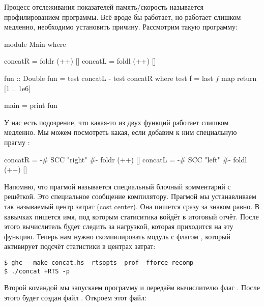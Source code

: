 Процесс отслеживания показателей память/скорость называется
профилированием программы. Всё вроде бы работает, но работает слишком
медленно, необходимо установить причину. Рассмотрим такую программу:


\begin{code}
module Main where

concatR = foldr (++) [] 
concatL = foldl (++) []

fun :: Double
fun = test concatL - test concatR
    where test f = last $ f $ map return [1 .. 1e6]

main = print fun
\end{code}

У нас есть подозрение, что какая-то из двух функций 
работает слишком медленно. Мы можем посмотреть какая, если добавим к ним
специальную прагму :


\begin{code}
concatR = {-# SCC "right" #-} foldr (++) [] 
concatL = {-# SCC "left"  #-} foldl (++) []
\end{code}

Напомню, что прагмой называется специальный блочный комментарий с
решёткой. Это специальное сообщение компилятору. Прагмой  мы
устанавливаем так называемый центр затрат (cost center). Она пишется
сразу за знаком равно. В кавычках пишется имя, под которым статиситика
войдёт в итоговый отчёт. После этого вычислитель будет следить за
нагрузкой, которая приходится на эту функцию. Теперь нам нужно
скомпилировать модуль с флагом , который активирует подсчёт
статистики в центрах затрат:


\begin{verbatim}
$ ghc --make concat.hs -rtsopts -prof -fforce-recomp
$ ./concat +RTS -p
\end{verbatim}

Второй командой мы запускаем программу и передаём вычислителю флаг
. После этого будет создан файл . Откроем этот
файл:


